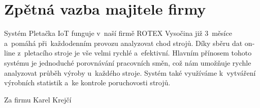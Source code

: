 \chapter{Zpětná vazba majitele firmy}
Systém Pletačka IoT funguje v~naší firmě ROTEX Vysočina již 3~měsíce a~pomáhá při~každodenním provozu analyzovat chod strojů.
Díky sběru dat on-line z~pletacího stroje je vše velmi rychlé a~efektivní.
Hlavním přínosem tohoto systému je jednoduché porovnávání pracovních směn, což nám umožňuje rychle analyzovat průběh výroby u~každého stroje.
Systém také využíváme k~vytváření výrobních statistik a~ke kontrole poruchovosti strojů.

{\raggedleft Za firmu Karel Krejčí\par}



\newpage